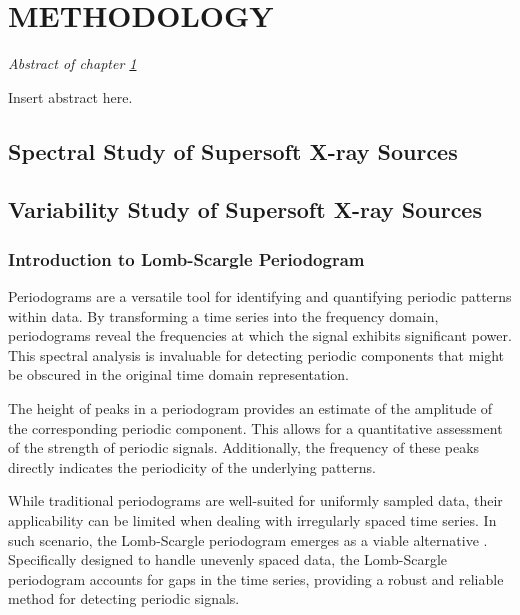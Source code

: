 \chapter{METHODOLOGY} \label{chap:methodology}
    \minitoc
    
    \newpage
    \begin{center}
    	\emph{Abstract of chapter \ref{chap:methodology}}
    \end{center}
    
    Insert abstract here.
    
    \section{Spectral Study of Supersoft X-ray Sources} \label{methodology:spectral}
    	
    	
    \section{Variability Study of Supersoft X-ray Sources} \label{methodology:variability}
    
    	\subsection{Introduction to Lomb-Scargle Periodogram}
    		Periodograms are a versatile tool for identifying and quantifying periodic patterns within data. By transforming a time series into the frequency domain, periodograms reveal the frequencies at which the signal exhibits significant power. This spectral analysis is invaluable for detecting periodic components that might be obscured in the original time domain representation.
    		
    		The height of peaks in a periodogram provides an estimate of the amplitude of the corresponding periodic component. This allows for a quantitative assessment of the strength of periodic signals. Additionally, the frequency of these peaks directly indicates the periodicity of the underlying patterns.
    		
    		While traditional periodograms are well-suited for uniformly sampled data, their applicability can be limited when dealing with irregularly spaced time series. In such scenario, the Lomb-Scargle periodogram emerges as a viable alternative \cite{lomb1976least,scargle1982studies}. Specifically designed to handle unevenly spaced data, the Lomb-Scargle periodogram accounts for gaps in the time series, providing a robust and reliable method for detecting periodic signals.
    		
